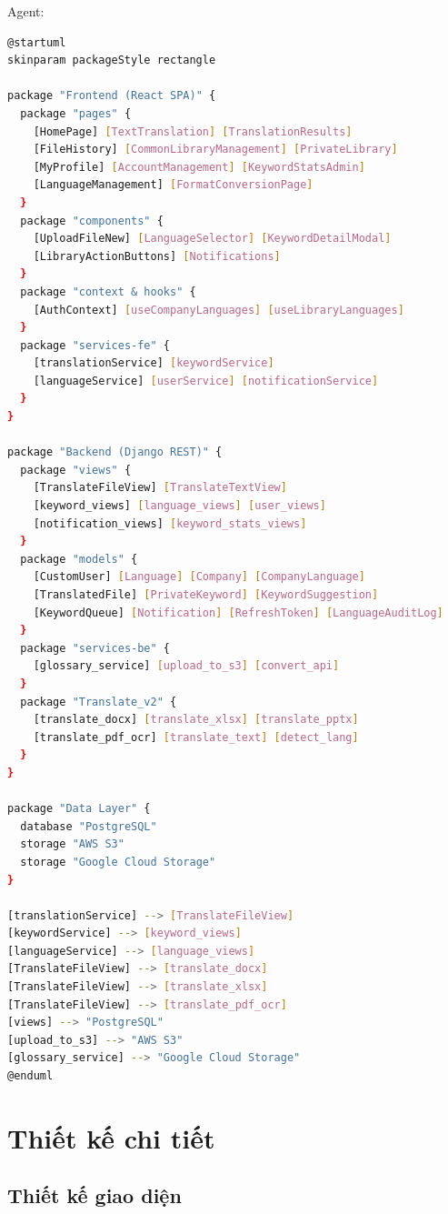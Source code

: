 Agent:
\begin{lstlisting}[language=bash, caption={PlantUML source -- Biểu đồ Package (dán vào https://www.plantuml.com/plantuml)}]
@startuml
skinparam packageStyle rectangle

package "Frontend (React SPA)" {
  package "pages" {
    [HomePage] [TextTranslation] [TranslationResults]
    [FileHistory] [CommonLibraryManagement] [PrivateLibrary]
    [MyProfile] [AccountManagement] [KeywordStatsAdmin]
    [LanguageManagement] [FormatConversionPage]
  }
  package "components" {
    [UploadFileNew] [LanguageSelector] [KeywordDetailModal]
    [LibraryActionButtons] [Notifications]
  }
  package "context & hooks" {
    [AuthContext] [useCompanyLanguages] [useLibraryLanguages]
  }
  package "services-fe" {
    [translationService] [keywordService]
    [languageService] [userService] [notificationService]
  }
}

package "Backend (Django REST)" {
  package "views" {
    [TranslateFileView] [TranslateTextView]
    [keyword_views] [language_views] [user_views]
    [notification_views] [keyword_stats_views]
  }
  package "models" {
    [CustomUser] [Language] [Company] [CompanyLanguage]
    [TranslatedFile] [PrivateKeyword] [KeywordSuggestion]
    [KeywordQueue] [Notification] [RefreshToken] [LanguageAuditLog]
  }
  package "services-be" {
    [glossary_service] [upload_to_s3] [convert_api]
  }
  package "Translate_v2" {
    [translate_docx] [translate_xlsx] [translate_pptx]
    [translate_pdf_ocr] [translate_text] [detect_lang]
  }
}

package "Data Layer" {
  database "PostgreSQL"
  storage "AWS S3"
  storage "Google Cloud Storage"
}

[translationService] --> [TranslateFileView]
[keywordService] --> [keyword_views]
[languageService] --> [language_views]
[TranslateFileView] --> [translate_docx]
[TranslateFileView] --> [translate_xlsx]
[TranslateFileView] --> [translate_pdf_ocr]
[views] --> "PostgreSQL"
[upload_to_s3] --> "AWS S3"
[glossary_service] --> "Google Cloud Storage"
@enduml
\end{lstlisting}

\section{Thiết kế chi tiết}

\subsection{Thiết kế giao diện}

